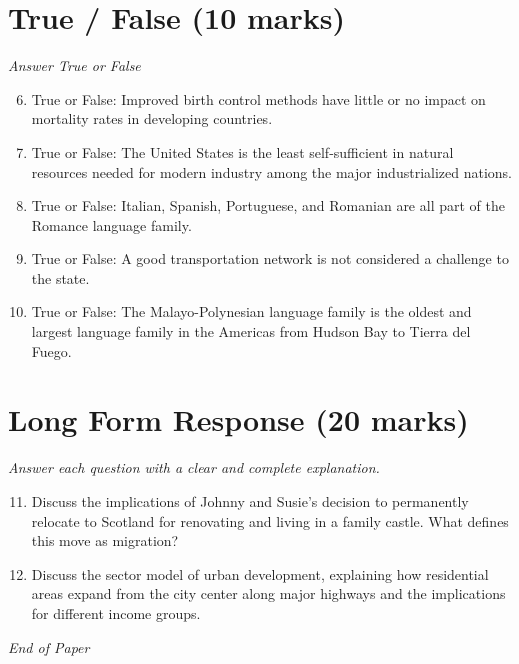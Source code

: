 \documentclass[12pt]{article}
\begin{document}
\section*{True / False (10 marks)}
\textit{Answer True or False}
\begin{enumerate}[label=\arabic*.]
\setcounter{enumi}{5}
\item True or False: Improved birth control methods have little or no impact on mortality rates in developing countries.
\item True or False: The United States is the least self-sufficient in natural resources needed for modern industry among the major industrialized nations.
\item True or False: Italian, Spanish, Portuguese, and Romanian are all part of the Romance language family.
\item True or False: A good transportation network is not considered a challenge to the state.
\item True or False: The Malayo-Polynesian language family is the oldest and largest language family in the Americas from Hudson Bay to Tierra del Fuego.
\end{enumerate}

\section*{Long Form Response (20 marks)}
\textit{Answer each question with a clear and complete explanation.}
\begin{enumerate}[label=\arabic*.]
\setcounter{enumi}{10}
\item Discuss the implications of Johnny and Susie's decision to permanently relocate to Scotland for renovating and living in a family castle. What defines this move as migration?
\item Discuss the sector model of urban development, explaining how residential areas expand from the city center along major highways and the implications for different income groups.
\end{enumerate}

\vfill
\noindent\textit{End of Paper}
\end{document}
